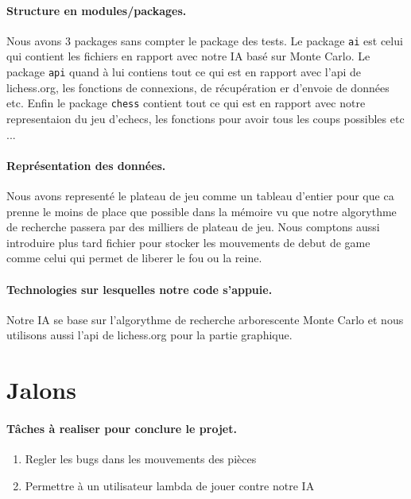 \documentclass{article}
\begin{document}
\paragraph{Structure en modules/packages.} Nous avons 3 packages sans compter le package des tests. Le
package {\tt ai} est celui qui contient les fichiers en rapport avec notre IA basé sur Monte Carlo. Le package
{\tt api} quand à lui contiens tout ce qui est en rapport avec l'api de lichess.org, les fonctions de connexions,
de récupération er d'envoie de données etc. Enfin le package {\tt chess} contient tout ce qui est en rapport avec
notre representaion du jeu d'echecs, les fonctions pour avoir tous les coups possibles etc ...

\paragraph{Représentation des données.} Nous avons representé le plateau de jeu comme un tableau d'entier
pour que ca prenne le moins de place que possible dans la mémoire vu que notre algorythme de recherche
passera par des milliers de plateau de jeu. Nous comptons aussi introduire plus tard fichier pour
stocker les mouvements de debut de game comme celui qui permet de liberer le fou ou la reine.

\paragraph{Technologies sur lesquelles notre code s'appuie.} Notre IA se base sur l'algorythme de recherche
arborescente Monte Carlo et nous utilisons aussi l'api de lichess.org pour la partie graphique.

\section{Jalons}
\paragraph{Tâches à realiser pour conclure le projet.} 
\begin{enumerate}
  \item Regler les bugs dans les mouvements des pièces
  \item Permettre à un utilisateur lambda de jouer contre notre IA
\end{enumerate}
\end{document}
